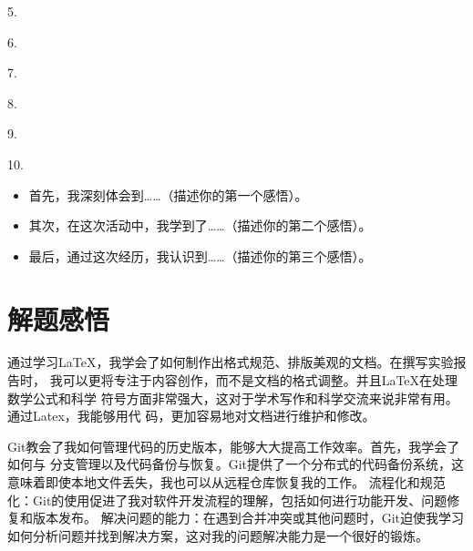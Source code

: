 \documentclass{article}
\begin{document}
5.

6.

7.

8.

9.

10.


\begin{itemize}
    \item 首先，我深刻体会到……（描述你的第一个感悟）。
    \item 其次，在这次活动中，我学到了……（描述你的第二个感悟）。
    \item 最后，通过这次经历，我认识到……（描述你的第三个感悟）。
\end{itemize}

\section{解题感悟}
通过学习LaTeX，我学会了如何制作出格式规范、排版美观的文档。在撰写实验报告时，
我可以更将专注于内容创作，而不是文档的格式调整。并且LaTeX在处理数学公式和科学
符号方面非常强大，这对于学术写作和科学交流来说非常有用。通过Latex，我能够用代
码，更加容易地对文档进行维护和修改。

Git教会了我如何管理代码的历史版本，能够大大提高工作效率。首先，我学会了如何与
分支管理以及代码备份与恢复。Git提供了一个分布式的代码备份系统，这意味着即使本地文件丢失，我也可以从远程仓库恢复我的工作。
流程化和规范化：Git的使用促进了我对软件开发流程的理解，包括如何进行功能开发、问题修复和版本发布。
解决问题的能力：在遇到合并冲突或其他问题时，Git迫使我学习如何分析问题并找到解决方案，这对我的问题解决能力是一个很好的锻炼。
\end{document}
